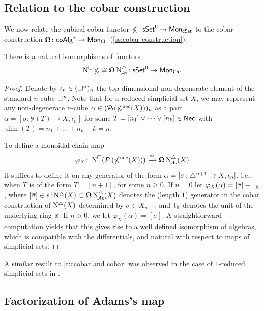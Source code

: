 \subsection{Relation to the cobar construction}

We now relate the cubical cobar functor $\operatorname{\mathbb{\Omega}} \colon \mathsf{sSet}^0 \to \mathsf{Mon}_{\mathsf{cSet}}$ to the cobar construction $\operatorname{\mathbf{\Omega}} \colon \mathsf{coAlg}^\ast \to \mathsf{Mon}_{\mathsf{Ch}}$ (\cref{ss:cobar construction}).

\begin{theorem}\label{t:ccobar and cobar}
	There is a natural isomorphisms of functors
	\[
	\operatorname{N^{\square}} \operatorname{\mathbb{\Omega}} \cong \operatorname{\mathbf{\Omega}} \operatorname{N^{\triangle}_{\!{\mathcal{A}\mathsf{s}}}} \colon \mathsf{sSet}^0 \to \mathsf{Mon}_{\mathsf{Ch}}.
	\]
\end{theorem}

\begin{proof}
	Denote by $\iota_n \in (\square^n)_n$ the top dimensional non-degenerate element of the standard $n$-cube $\square^n$.
	Note that for a reduced simplicial set $X$, we may represent any non-degenerate $n$-cube $\alpha \in (\mathcal{P}_!(\operatorname{\mathbb{\Omega}^{\mathrm{nec}}}(X)))_n$ as a pair $\alpha = [\sigma \colon \mathcal{Y}(T) \to X, \iota_n]$ for some $T = [n_1] \vee \dots \vee [n_k] \in \mathsf{Nec}$ with $\dim(T) = n_1 + \dots + n_k - k = n$.

	To define a monoidal chain map
	\[
	\varphi_X \colon \operatorname{N^{\square}}(\mathcal{P}_!(\operatorname{\mathbb{\Omega}^{\mathrm{nec}}}(X))) \xrightarrow{\cong} \operatorname{\mathbf{\Omega}} \operatorname{N^{\triangle}_{\!{\mathcal{A}\mathsf{s}}}}(X)
	\]
	it suffices to define it on any generator of the form $\alpha=[\sigma \colon \triangle^{n+1} \to X, \iota_{n}]$, i.e., when $T$ is of the form $T = [n+1]$, for some $n \geq 0$.
	If $n = 0$ let $\varphi_X(\alpha)= [\overline{\sigma}] + 1_\Bbbk$, where $[\overline{\sigma}] \in \s{-1} \overline{ \schains(X)} \subset \cobar \schainsA(X)$ denotes the (length $1$) generator in the cobar construction of $\operatorname{N^{\triangle}}(X)$ determined by $\sigma \in X_{n+1}$ and $1_\Bbbk$ denotes the unit of the underlying ring $\Bbbk$.
	If $n > 0$, we let $\varphi_X(\alpha)=[\overline{\sigma}]$.
	A straightforward computation yields that this gives rise to a well defined isomorphism of algebras, which is compatible with the differentials, and natural with respect to maps of simplicial sets.
\end{proof}

A similar result to \cref{t:ccobar and cobar} was observed in the case of $1$-reduced simplicial sets in \cite[Section~3.5]{berger1995loops}.

\subsection{Factorization of Adams's map}\label{ss:factorization of adams}

